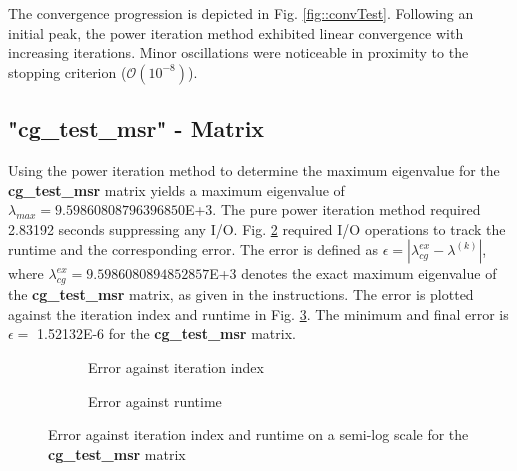\documentclass[11pt,a4paper]{article}
\newcommand{\refFig}[1]{Fig. \ref{#1}}
\begin{document}
The convergence progression is depicted in \refFig{fig::convTest}. Following an initial peak, the power iteration method exhibited linear convergence with increasing iterations. Minor oscillations were noticeable in proximity to the stopping criterion ($\mathcal{O}(10^{-8})$).

\subsection{"{cg\_test\_msr}" - Matrix}
Using the power iteration method to determine the maximum eigenvalue for the \textbf{cg\_test\_msr} matrix yields a maximum eigenvalue of $\lambda_{max} = 9.59860808796396850$E+3. The pure power iteration method required 2.83192 seconds suppressing any I/O. \refFig{fig::Power2} required I/O operations to track the runtime and the corresponding error. The error is defined as $\epsilon = |\lambda_{cg}^{ex} - \lambda^{(k)}|$, where $\lambda_{cg}^{ex} = 9.5986080894852857$E+3 denotes the exact maximum eigenvalue of the \textbf{cg\_test\_msr} matrix, as given in the instructions. The error is plotted against the iteration index and runtime in \refFig{fig::PowerIt}. The minimum and final error is $\epsilon =$ 1.52132E-6 for the \textbf{cg\_test\_msr} matrix.

\begin{figure}[h!]
	\centering
	\begin{subfigure}[h!]{.49\textwidth}
		\begin{center}
			\resizebox{0.52\width}{!}{}
			\caption{Error against iteration index}
			\label{fig::Power1}
		\end{center}	
	\end{subfigure}
	\hfill
	\begin{subfigure}[h!]{.49\textwidth}
		\centering
		\resizebox{0.52\width}{!}{}
		\caption{Error against runtime}
		\label{fig::Power2}
	\end{subfigure}
	\caption{Error against iteration index and runtime on a semi-log scale for the \textbf{cg\_test\_msr} matrix}
	\label{fig::PowerIt}
\end{figure}
	
\end{document}
